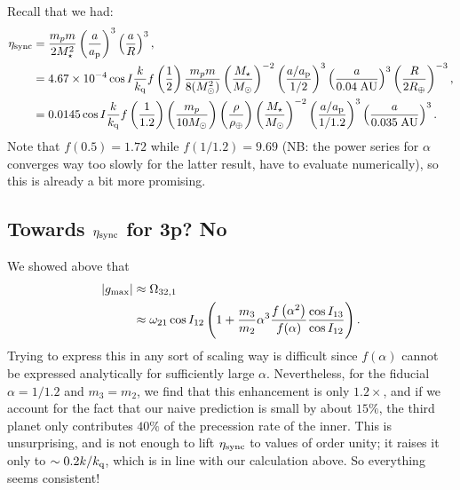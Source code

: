 \documentclass[11pt,
        usenames, %
        dvipsnames %
    ]{article}
\newcommand*{\abs}[1]{\left|#1\right|}
\newcommand*{\p}[1]{\left(#1\right)}
\begin{document}
Recall that we had:
\begin{align}
    \eta_{\rm sync} &= \frac{m_pm}{2M_\star^2}\p{\frac{a}{a_{\rm p}}}^3
            \p{\frac{a}{R}}^3,\\
        &= 4.67 \times 10^{-4}
            \cos I \frac{k}{k_{\rm q}}f\p{\frac{1}{2}}
            \frac{m_pm}{8(M_{\odot}^2)}
            \p{\frac{M_\star}{M_{\odot}}}^{-2}
            \p{\frac{a/a_{\rm p}}{1/2}}^3
            \p{\frac{a}{0.04\;\mathrm{AU}}}^3
            \p{\frac{R}{2R_{\oplus}}}^{-3},\\
        &= 0.0145
            \cos I \frac{k}{k_{\rm q}}f\p{\frac{1}{1.2}}
            \p{\frac{m_p}{10M_{\odot}}}
            \p{\frac{\rho}{\rho_{\oplus}}}
            \p{\frac{M_\star}{M_{\odot}}}^{-2}
            \p{\frac{a/a_{\rm p}}{1/1.2}}^3
            \p{\frac{a}{0.035\;\mathrm{AU}}}^3.
\end{align}
Note that $f(0.5) = 1.72$ while $f(1/1.2) = 9.69$ (NB\@: the power series for
$\alpha$ converges way too slowly for the latter result, have to evaluate
numerically), so this is already a bit more promising.

\subsection{Towards $\eta_{\rm sync}$ for 3p? No}

We showed above that
\begin{align}
    \abs{g_{\max}} &\approx \Omega_{\rm 32, 1}\nonumber\\
        &\approx \omega_{21}\cos I_{12}
            \p{1 + \frac{m_3}{m_2}\alpha^3\frac{f\p{\alpha^2}}{f(\alpha)}
                \frac{\cos I_{13}}{\cos I_{12}}}.
\end{align}
Trying to express this in any sort of scaling way is difficult since $f(\alpha)$
cannot be expressed analytically for sufficiently large $\alpha$. Nevertheless,
for the fiducial $\alpha = 1/1.2$ and $m_3 = m_2$, we find that this enhancement
is only $1.2\times$, and if we account for the fact that our naive prediction
is small by about $15\%$, the third planet only contributes $40\%$ of the
precession rate of the inner. This is unsurprising, and is not enough to lift
$\eta_{\rm sync}$ to values of order unity; it raises it only to $\sim 0.2
k/k_{\rm q}$, which is in line with our calculation above. So everything seems
consistent!
\end{document}
